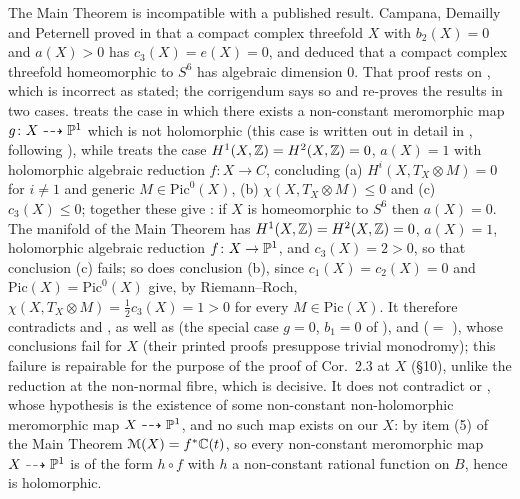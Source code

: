 The Main Theorem is incompatible with a published result. Campana, Demailly and Peternell proved in \cite{CDP98} that a compact complex threefold $X$ with $b_2(X) = 0$ and $a(X) > 0$ has $c_3(X) = e(X) = 0$, and deduced that a compact complex threefold homeomorphic to $S^6$ has algebraic dimension $0$. That proof rests on \cite[Lemma 1.5]{CDP98}, which is incorrect as stated; the corrigendum \cite{CDP20} says so and re-proves the results in two cases. \cite[Thm.\ 2.1]{CDP20} treats the case in which there exists a non-constant meromorphic map $g\colon X \dashrightarrow \mathbb{P}^1$ which is not holomorphic (this case is written out in detail in \cite[Thm.\ 3.1, Cor.\ 3.2]{LRS}, following \cite{CDP98}), while \cite[Thm.\ 2.2]{CDP20} treats the case $H^1(X,\mathbb{Z}) = H^2(X,\mathbb{Z}) = 0$, $a(X) = 1$ with holomorphic algebraic reduction $f\colon X \to C$, concluding (a) $H^i(X,T_X\otimes M) = 0$ for $i \ne 1$ and generic $M \in \mathrm{Pic}^0(X)$, (b) $\chi(X,T_X\otimes M) \le 0$ and (c) $c_3(X) \le 0$; together these give \cite[Cor.\ 2.3]{CDP20}: if $X$ is homeomorphic to $S^6$ then $a(X) = 0$. The manifold of the Main Theorem has $H^1(X,\mathbb{Z}) = H^2(X,\mathbb{Z}) = 0$, $a(X) = 1$, holomorphic algebraic reduction $f\colon X \to \mathbb{P}^1$, and $c_3(X) = 2 > 0$, so that conclusion (c) fails; so does conclusion (b), since $c_1(X) = c_2(X) = 0$ and $\mathrm{Pic}(X) = \mathrm{Pic}^0(X)$ give, by Riemann--Roch, $\chi(X,T_X\otimes M) = \tfrac12 c_3(X) = 1 > 0$ for every $M \in \mathrm{Pic}(X)$. It therefore contradicts \cite[Thm.\ 2.2]{CDP20} and \cite[Cor.\ 2.3]{CDP20}, as well as \cite[Lemma 4.2]{CDP20} (the special case $g=0$, $b_1=0$ of \cite[Lemma 3.2]{CDP98}), \cite[Cor.\ 5.2]{CDP20} and \cite[Prop.\ 5.5]{CDP20} ($=$ \cite[Thm.\ 3.1, Rem.\ 3.8(1)]{CDP98}), whose conclusions fail for $X$ (their printed proofs presuppose trivial monodromy); this failure is repairable for the purpose of the proof of Cor.\ 2.3 at $X$ (\S10), unlike the reduction at the non-normal fibre, which is decisive. It does not contradict \cite[Thm.\ 2.1]{CDP20} or \cite{LRS}, whose hypothesis is the existence of some non-constant non-holomorphic meromorphic map $X \dashrightarrow \mathbb{P}^1$, and no such map exists on our $X$: by item (5) of the Main Theorem $\mathcal M(X) = f^*\mathbb{C}(t)$, so every non-constant meromorphic map $X \dashrightarrow \mathbb{P}^1$ is of the form $h \circ f$ with $h$ a non-constant rational function on $B$, hence is holomorphic.

